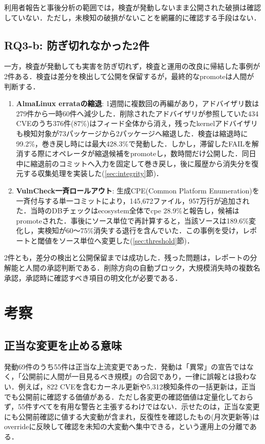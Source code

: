 \documentclass{css}
\begin{document}
利用者報告と事後分析の範囲では，検査が発動しないまま公開された破損は確認していない．ただし，未検知の破損がないことを網羅的に確認する手段はない．

\subsection{RQ3-b: 防ぎ切れなかった2件}
\label{sec:missed}

一方，検査が発動しても実害を防ぎ切れず，検査と運用の改良に帰結した事例が2件ある．検査は差分を検出して公開を保留するが，最終的なpromoteは人間が判断する．

\begin{enumerate}
\item \textbf{AlmaLinux errataの縮退}:
1週間に複数回の再編があり，アドバイザリ数は279件から一時60件へ減少した．削除されたアドバイザリが参照していた434 CVEのうち376件(87\%)はフィード全体から消え，残ったkernelアドバイザリも検知対象が73パッケージから2パッケージへ縮退した．検査は縮退時に99.2\%，巻き戻し時には最大428.3\%で発動した．しかし，滞留したFAILを解消する際にオペレータが縮退候補をpromoteし，数時間だけ公開した．同日中に縮退前のコミットへ入力を固定して巻き戻し，後に履歴から消失分を復元する収集処理を実装した(\ref{sec:integrity}節)．
\item \textbf{VulnCheck一斉ロールアウト}:
生成CPE(Common Platform Enumeration)を一斉付与する単一コミットにより，145,672ファイル，957万行が追加された．当時のDBチェックはecosystem全体でcpe 28.9\%と報告し，候補はpromoteされた．事後にソース単位で再計算すると，当該ソースは189.6\%変化し，実検知が60〜75\%消失する退行を含んでいた．この事例を受け，レポートと閾値をソース単位へ変更した(\ref{sec:threshold}節)．
\end{enumerate}

2件とも，差分の検出と公開保留までは成功した．残った問題は，レポートの分解能と人間の承認判断である．削除方向の自動ブロック，大規模消失時の複数名承認，承認時に確認すべき項目の明文化が必要である．

\section{考察}
\label{sec:discussion}

\subsection{正当な変更を止める意味}
\label{sec:fp}

発動69件のうち55件は正当な上流変更であった．発動は「異常」の宣告ではなく，「公開前に人間が一目見るべき規模」の合図であり，一律に誤報とは扱わない．例えば，822 CVEを含むカーネル更新や5,312検知条件の一括更新は，正当でも公開前に確認する価値がある．ただし各変更の確認価値は定量化しておらず，55件すべてを有用な警告と主張するわけではない．示せたのは，正当な変更にも公開前確認に値する大変動が含まれ，反復性を確認したもの(月次更新等)はoverrideに反映して確認を未知の大変動へ集中できる，という運用上の分離である．
\end{document}
